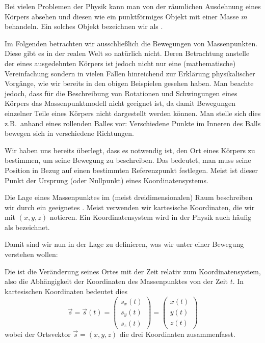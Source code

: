 \begin{MContent}

\begin{MInfo}
  Bei vielen Problemen der Physik kann man von der r\"aumlichen Ausdehnung eines K\"orpers absehen und diesen wie ein punktf\"ormiges Objekt mit einer Masse $m$ behandeln. Ein solches Objekt bezeichnen wir als . 
\end{MInfo}

Im Folgenden betrachten wir ausschlie{\ss}lich die Bewegungen von Massenpunkten. Diese gibt es in der realen Welt so nat\"urlich nicht. Deren Betrachtung anstelle der 
eines ausgedehnten K\"orpers ist jedoch nicht nur eine (mathematische) Vereinfachung sondern in vielen F\"allen hinreichend zur Erkl\"arung physikalischer Vorg\"ange, wie wir bereits in den obigen Beispielen gesehen haben. Man beachte jedoch, dass f\"ur die Beschreibung von Rotationen und Schwingungen eines K\"orpers das Massenpunktmodell nicht geeignet ist, da damit Bewegungen einzelner Teile eines K\"orpers nicht dargestellt werden k\"onnen. Man stelle sich dies z.B.~anhand eines rollenden Balles vor: Verschiedene Punkte im Inneren des Balls bewegen sich in verschiedene Richtungen.
 


Wir haben uns bereits \"uberlegt, dass es notwendig ist, den Ort eines K\"orpers zu  bestimmen, um seine Bewegung zu beschreiben. Das bedeutet, man muss seine Position in Bezug auf einen bestimmten Referenzpunkt festlegen. Meist ist dieser Punkt der Ursprung (oder Nullpunkt) eines Koordinatensystems. 
\begin{MInfo}
  Die Lage eines Massenpunktes im (meist dreidimensionalen) Raum beschreiben wir durch ein geeignetes . Meist verwenden wir kartesische Koordinaten, die wir mit $(x,y,z)$ notieren. Ein Koordinatensystem wird in der Physik auch h\"aufig als  bezeichnet.
\end{MInfo}

Damit sind wir nun in der Lage zu definieren, was wir unter einer Bewegung verstehen wollen:

\begin{MInfo}
  Die  ist die Ver\"anderung seines Ortes mit der Zeit relativ zum Koordinatensystem, also die Abh\"angigkeit der Koordinaten des Massenpunktes von der Zeit $t$. In kartesischen Koordinaten bedeutet dies
$$
\vec{s} = \vec{s}(t)=\left(\begin{array}{c} s_x(t) \\ s_y(t) \\ s_z(t) \end{array}\right)=\left(\begin{array}{c} x(t) \\ y(t) \\ z(t) \end{array}\right)
$$
wobei der Ortsvektor $\vec{s}=(x,y,z)$ die drei Koordinaten zusammenfasst.
\end{MInfo}




\end{MContent}

